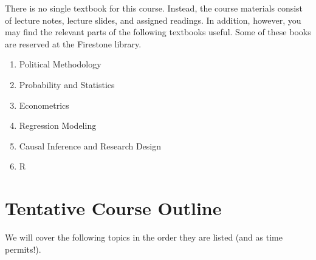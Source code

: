 \documentclass[11pt]{article}
\begin{document}
There is no single textbook for this course.  Instead, the course
materials consist of lecture notes, lecture slides, and assigned
readings.  In addition, however, you may find the relevant parts of
the following textbooks useful.  Some of these books are reserved at
the Firestone library.
\begin{enumerate}
\item Political Methodology
  \begin{bibunit}[unsrtnat]
    \nocite{king:98}
    \putbib[my]
  \end{bibunit}
  
\item Probability and Statistics
  \begin{bibunit}[unsrtnat]
    \nocite{degr:sche:02,wass:05}
    \putbib[my]
  \end{bibunit}
  
\item Econometrics
  \begin{bibunit}[unsrtnat]
   \nocite{haya:00,wool:02}
   \putbib[my]
 \end{bibunit}
 
\item Regression Modeling
  \begin{bibunit}[unsrtnat]
   \nocite{gelm:hill:07}
   \putbib[my]
 \end{bibunit}

\item Causal Inference and Research Design
  \begin{bibunit}[unsrtnat]
    \nocite{morg:wins:07,angr:pisc:09}
    \putbib[my]
  \end{bibunit}
 
\item R
  \begin{bibunit}[unsrtnat]
    \nocite{fox:02}
    \putbib[my]
  \end{bibunit}
\end{enumerate}

\section{Tentative Course Outline}

We will cover the following topics in the order they are listed (and as time permits!).
\end{document}
